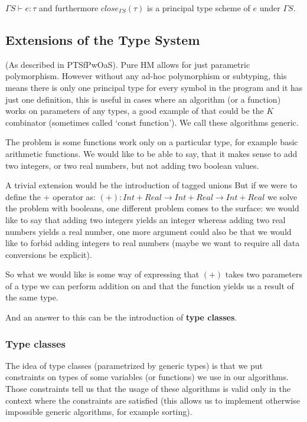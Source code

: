$\Gamma S \vdash e : \tau$ and furthermore $close_{\Gamma S}(\tau)$ is a principal type scheme of $e$ under $\Gamma S$.

\subsection{Extensions of the Type System}

(As described in PTSfPwOaS).
Pure HM allows for just parametric polymorphism. However without any ad-hoc polymorphism or subtyping, this means there is only one principal type for every symbol in the program and it has just one definition, this is useful in cases where an algorithm (or a function) works on parameters of any types, a good example of that could be the $K$ combinator (sometimes called `const function'). We call these algorithms generic.

The problem is some functions work only on a particular type, for example basic arithmetic functions. We would like to be able to say, that it makes sense to add two integers, or two real numbers, but not adding two boolean values.

A trivial extension would be the introduction of tagged unions %
But if we were to define the $+$ operator as: $(+) : Int + Real \rightarrow Int + Real \rightarrow Int + Real$ we solve the problem with booleans, one different problem comes to the surface: we would like to say that adding two integers yields an integer whereas adding two real numbers yields a real number, one more argument could also be that we would like to forbid adding integers to real numbers (maybe we want to require all data conversions be explicit).

So what we would like is some way of expressing that $(+)$ takes two parameters of a type we can perform addition on and that the function yields us a result of the same type.

And an answer to this can be the introduction of \textbf{type classes}.

\subsubsection{Type classes}

The idea of type classes (parametrized by generic types) is that we put constraints on types of some variables (or functions) we use in our algorithms. Those constraints tell us that the usage of these algorithms is valid only in the context where the constraints are satisfied (this allows us to implement otherwise impossible generic algorithms, for example sorting).

